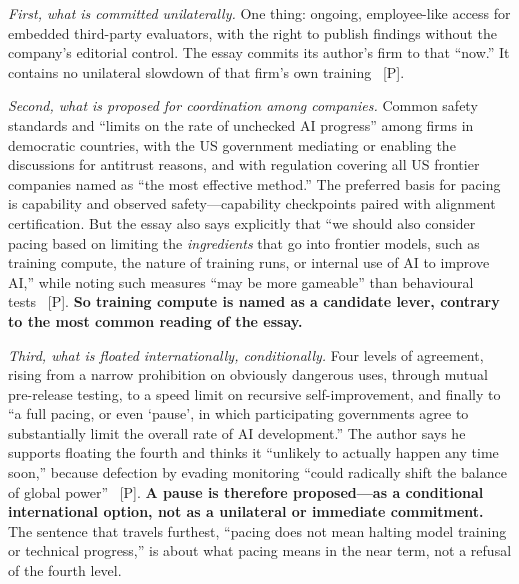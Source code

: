 \emph{First, what is committed unilaterally.} One thing: ongoing, employee-like access for embedded third-party evaluators, with the right to publish findings without the company's editorial control. The essay commits its author's firm to that ``now.'' It contains no unilateral slowdown of that firm's own training~\cite{amodei-pacing} [P].

\emph{Second, what is proposed for coordination among companies.} Common safety standards and ``limits on the rate of unchecked AI progress'' among firms in democratic countries, with the US government mediating or enabling the discussions for antitrust reasons, and with regulation covering all US frontier companies named as ``the most effective method.'' The preferred basis for pacing is capability and observed safety---capability checkpoints paired with alignment certification. But the essay also says explicitly that ``we should also consider pacing based on limiting the \emph{ingredients} that go into frontier models, such as training compute, the nature of training runs, or internal use of AI to improve AI,'' while noting such measures ``may be more gameable'' than behavioural tests~\cite{amodei-pacing} [P]. \textbf{So training compute is named as a candidate lever, contrary to the most common reading of the essay.}

\emph{Third, what is floated internationally, conditionally.} Four levels of agreement, rising from a narrow prohibition on obviously dangerous uses, through mutual pre-release testing, to a speed limit on recursive self-improvement, and finally to ``a full pacing, or even `pause', in which participating governments agree to substantially limit the overall rate of AI development.'' The author says he supports floating the fourth and thinks it ``unlikely to actually happen any time soon,'' because defection by evading monitoring ``could radically shift the balance of global power''~\cite{amodei-pacing} [P]. \textbf{A pause is therefore proposed---as a conditional international option, not as a unilateral or immediate commitment.} The sentence that travels furthest, ``pacing does not mean halting model training or technical progress,'' is about what pacing means in the near term, not a refusal of the fourth level.

